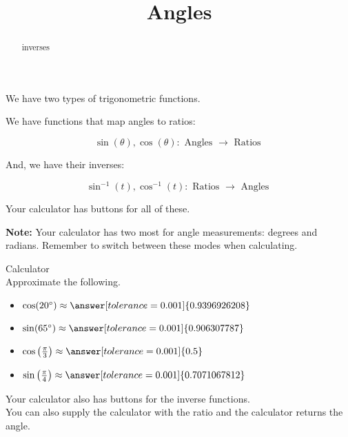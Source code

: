\documentclass{ximera}
\title{Angles}
\begin{document}
\begin{abstract}
inverses
\end{abstract}
\maketitle




We have two types of trigonometric functions.


We have functions that map angles to ratios:


\[
\sin(\theta), \cos(\theta) :  \text{ Angles } \to \text{ Ratios }
\]


And, we have their inverses:



\[
\sin^{-1}(t), \cos^{-1}(t) :  \text{ Ratios } \to \text{ Angles }
\]








Your calculator has buttons for all of these.


\textbf{Note:}  Your calculator has two most for angle measurements: degrees and radians.  Remember to switch between these modes when calculating.



\begin{question} Calculator \\

Approximate the following.

\begin{itemize}
\item $\cos(20^{\circ}) \approx \answer[tolerance=0.001]{0.9396926208}$
\item $\sin(65^{\circ}) \approx \answer[tolerance=0.001]{0.906307787}$
\item $\cos\left( \frac{\pi}{3} \right) \approx \answer[tolerance=0.001]{0.5}$
\item $\sin\left( \frac{\pi}{4} \right) \approx \answer[tolerance=0.001]{0.7071067812}$
\end{itemize}

\end{question}





Your calculator also has buttons for the inverse functions. \\




You can also supply the calculator with the ratio and the calculator returns the angle.
\end{document}
